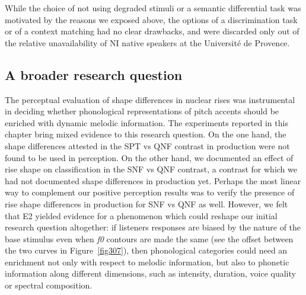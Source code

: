 While the choice of not using degraded stimuli or a semantic differential task was motivated by the reasons we exposed above, the options of a discrimination task or of a context matching had no clear drawbacks, and were discarded only out of the relative unavailability of NI native speakers at the Université de Provence. 

\subsection{A broader research question}\label{sec342}
The perceptual evaluation of shape differences in nuclear rises was instrumental in deciding whether phonological representations of pitch accents should be enriched with dynamic melodic information. The experiments reported in this chapter bring mixed evidence to this research question. On the one hand, the shape differences attested in the SPT vs QNF contrast in production were not found to be used in perception. On the other hand, we documented an effect of rise shape on classification in the SNF vs QNF contrast, a contrast for which we had not documented shape differences in production yet. Perhaps the most linear way to complement our positive perception results was to verify the presence of rise shape differences in production for SNF vs QNF as well. However, we felt that E2 yielded evidence for a phenomenon which could reshape our initial research question altogether: if listeners responses are biased by the nature of the base stimulus even when \textit{f0} contours are made the same (see the offset between the two curves in Figure~\ref{fig307}), then phonological categories could need an enrichment not only with respect to melodic information, but also to phonetic information along different dimensions, such as intensity, duration, voice quality or spectral composition. 

